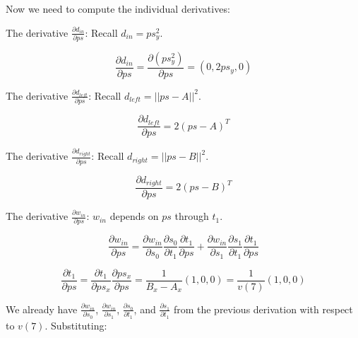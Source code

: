\documentclass[11pt]{article}
\begin{document}
                Now we need to compute the individual derivatives:

                The derivative $\frac{\partial d_{in}}{\partial ps}$:
                Recall $d_{in} = ps_y^2$.

                \begin{equation}
                    \frac{\partial d_{in}}{\partial ps} = \frac{\partial (ps_y^2)}{\partial ps} = (0, 2ps_y, 0)
                \end{equation}

                The derivative $\frac{\partial d_{left}}{\partial ps}$:
                Recall $d_{left} = ||ps - A||^2$.

                \begin{equation}
                    \frac{\partial d_{left}}{\partial ps} = 2(ps - A)^T
                \end{equation}

                The derivative $\frac{\partial d_{right}}{\partial ps}$:
                Recall $d_{right} = ||ps - B||^2$.

                \begin{equation}
                    \frac{\partial d_{right}}{\partial ps} = 2(ps - B)^T
                \end{equation}

                The derivative $\frac{\partial w_{in}}{\partial ps}$:  $w_{in}$ depends on $ps$ through $t_1$.

                \begin{equation}
                    \frac{\partial w_{in}}{\partial ps} = \frac{\partial w_{in}}{\partial s_0} \frac{\partial s_0}{\partial t_1} \frac{\partial t_1}{\partial ps} + \frac{\partial w_{in}}{\partial s_1} \frac{\partial s_1}{\partial t_1} \frac{\partial t_1}{\partial ps}
                \end{equation}

                \begin{equation}
                    \frac{\partial t_1}{\partial ps} = \frac{\partial t_1}{\partial ps_x} \frac{\partial ps_x}{\partial ps} =  \frac{1}{B_x - A_x} (1, 0, 0) = \frac{1}{v(7)}(1,0,0)
                \end{equation}

                We already have $\frac{\partial w_{in}}{\partial s_0}$, $\frac{\partial w_{in}}{\partial s_1}$, $\frac{\partial s_0}{\partial t_1}$, and $\frac{\partial s_1}{\partial t_1}$ from the previous derivation with respect to $v(7)$.  Substituting:
\end{document}
